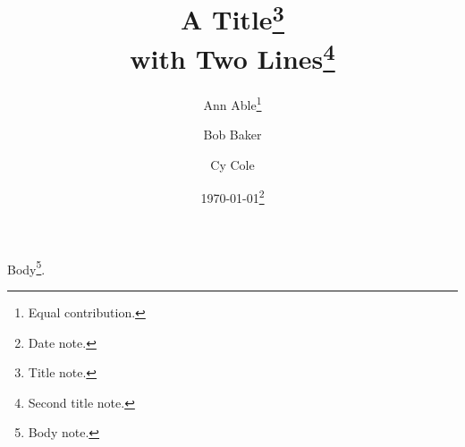 \documentclass{article}
\title{A Title\footnote{Title note.}\\ with \textbf{Two} Lines\thanks{Second title note.}}
\author{Ann Able\thanks{Equal contribution.} \and Bob Baker\footnotemark[3] \and Cy Cole\footnotemark[1]}
\date{\today\thanks{Date note.}}
\begin{document}
\maketitle
Body\footnote{Body note.}.
\end{document}
